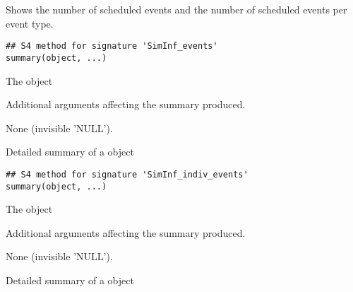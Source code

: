 \documentclass[letterpaper]{book}
\begin{document}
%
\begin{Description}
Shows the number of scheduled events and the number of scheduled
events per event type.
\end{Description}
%
\begin{Usage}
\begin{verbatim}
## S4 method for signature 'SimInf_events'
summary(object, ...)
\end{verbatim}
\end{Usage}
%
\begin{Arguments}
\begin{ldescription}
\item[\code{object}] The  object

\item[\code{...}] Additional arguments affecting the summary produced.
\end{ldescription}
\end{Arguments}
%
\begin{Value}
None (invisible 'NULL').
\end{Value}
%
\begin{Description}
Detailed summary of a  object
\end{Description}
%
\begin{Usage}
\begin{verbatim}
## S4 method for signature 'SimInf_indiv_events'
summary(object, ...)
\end{verbatim}
\end{Usage}
%
\begin{Arguments}
\begin{ldescription}
\item[\code{object}] The  object

\item[\code{...}] Additional arguments affecting the summary produced.
\end{ldescription}
\end{Arguments}
%
\begin{Value}
None (invisible 'NULL').
\end{Value}
%
\begin{Description}
Detailed summary of a  object
\end{Description}
\end{document}
